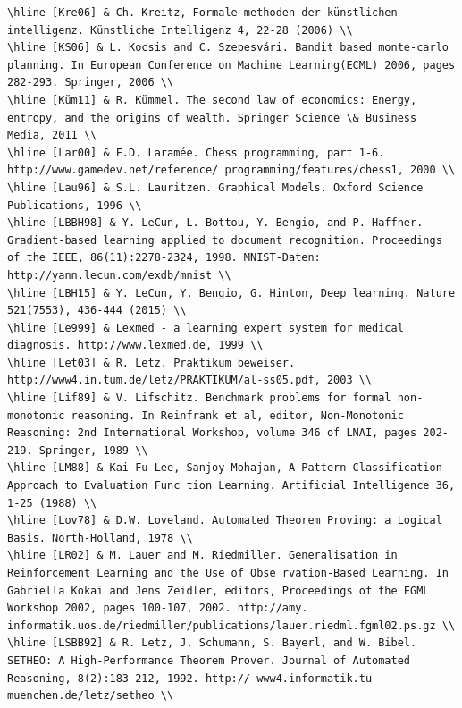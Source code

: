 \documentclass[10pt]{book}
\begin{document}
\begin{center}
\begin{enumerate}
\begin{center}
\begin{center}
\begin{center}
\begin{center}
\begin{center}
\begin{verbatim}
\hline [Kre06] & Ch. Kreitz, Formale methoden der künstlichen intelligenz. Künstliche Intelligenz 4, 22-28 (2006) \\
\hline [KS06] & L. Kocsis and C. Szepesvári. Bandit based monte-carlo planning. In European Conference on Machine Learning(ECML) 2006, pages 282-293. Springer, 2006 \\
\hline [Küm11] & R. Kümmel. The second law of economics: Energy, entropy, and the origins of wealth. Springer Science \& Business Media, 2011 \\
\hline [Lar00] & F.D. Laramée. Chess programming, part 1-6. http://www.gamedev.net/reference/ programming/features/chess1, 2000 \\
\hline [Lau96] & S.L. Lauritzen. Graphical Models. Oxford Science Publications, 1996 \\
\hline [LBBH98] & Y. LeCun, L. Bottou, Y. Bengio, and P. Haffner. Gradient-based learning applied to document recognition. Proceedings of the IEEE, 86(11):2278-2324, 1998. MNIST-Daten: http://yann.lecun.com/exdb/mnist \\
\hline [LBH15] & Y. LeCun, Y. Bengio, G. Hinton, Deep learning. Nature 521(7553), 436-444 (2015) \\
\hline [Le999] & Lexmed - a learning expert system for medical diagnosis. http://www.lexmed.de, 1999 \\
\hline [Let03] & R. Letz. Praktikum beweiser. http://www4.in.tum.de/letz/PRAKTIKUM/al-ss05.pdf, 2003 \\
\hline [Lif89] & V. Lifschitz. Benchmark problems for formal non-monotonic reasoning. In Reinfrank et al, editor, Non-Monotonic Reasoning: 2nd International Workshop, volume 346 of LNAI, pages 202-219. Springer, 1989 \\
\hline [LM88] & Kai-Fu Lee, Sanjoy Mohajan, A Pattern Classification Approach to Evaluation Func tion Learning. Artificial Intelligence 36, 1-25 (1988) \\
\hline [Lov78] & D.W. Loveland. Automated Theorem Proving: a Logical Basis. North-Holland, 1978 \\
\hline [LR02] & M. Lauer and M. Riedmiller. Generalisation in Reinforcement Learning and the Use of Obse rvation-Based Learning. In Gabriella Kokai and Jens Zeidler, editors, Proceedings of the FGML Workshop 2002, pages 100-107, 2002. http://amy. informatik.uos.de/riedmiller/publications/lauer.riedml.fgml02.ps.gz \\
\hline [LSBB92] & R. Letz, J. Schumann, S. Bayerl, and W. Bibel. SETHEO: A High-Performance Theorem Prover. Journal of Automated Reasoning, 8(2):183-212, 1992. http:// www4.informatik.tu-muenchen.de/letz/setheo \\

\end{verbatim}
\end{center}
\end{center}
\end{center}
\end{center}
\end{center}
\end{enumerate}
\end{center}
\end{document}
